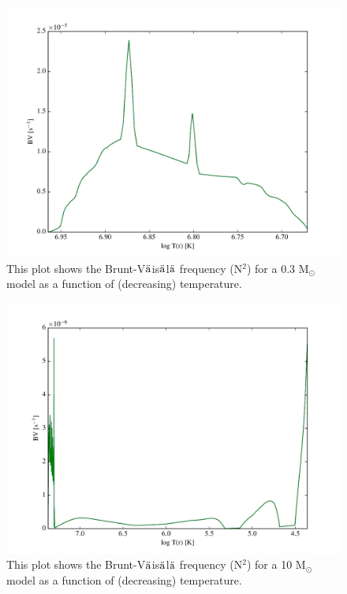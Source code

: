 \documentclass[12pt]{article}
\begin{document}
\begin{figure}
  \centering
  \includegraphics[width=7.0in]{littleBV.pdf}
  \caption{This plot shows the
  Brunt-V$\ddot{\rm a}$is$\ddot{\rm a}$l$\ddot{\rm a}$
  frequency (N$^2$) for a
  0.3 M$_{\odot}$ model as a function of (decreasing)
  temperature. }
  \label{littleBV}
\end{figure}
\begin{figure}
  \centering
  \includegraphics[width=7.0in]{bigBV.pdf}
  \caption{This plot shows the
  Brunt-V$\ddot{\rm a}$is$\ddot{\rm a}$l$\ddot{\rm a}$
  frequency (N$^2$) for a 10 M$_{\odot}$ model as a function
  of (decreasing) temperature.}
  \label{bigBV}
\end{figure}
\end{document}
